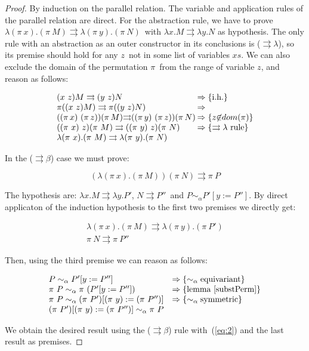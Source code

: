 \documentclass[preprint,10pt]{sigplanconf}
\newcommand{\lam}{\ensuremath{\lambda}}
\newcommand{\alpsym}{\ensuremath{\sim_\alpha}}
\newcommand{\p}{\ensuremath{\rightrightarrows}}
\begin{document}
\begin{proof}
By induction on the parallel relation. The variable and application rules of the parallel relation are direct. For the abstraction rule,  we have to prove $\lam (\pi\ x) . (\pi\ M)  \p  \lam (\pi\ y) . (\pi\ N)$\ with $\lambda x . M  \p  \lambda y . N$ as hypothesis.
The only rule with an abstraction as an outer constructor in its conclusions is ($\p\!\!\lam$), so its premise should hold for any $z$\ not in some list of variables $xs$. We can also exclude the domain of the permutation $\pi$\ from the range of variable $z$, and reason as follows: 

\[
\begin{array}{l@{\hspace{0.2em}}l}
  (x\ z) M \p (y\ z) N & \Rightarrow  \{\text{i.h.} \} \\
  \pi ((x\ z) M) \p \pi ((y\ z) N) & \Rightarrow \\
  ((\pi\,x)\ (\pi\,z)) (\pi\,M) {\p} ((\pi\,y)\ (\pi\,z)) (\pi\,N) & \Rightarrow \{z {\not\in} dom(\pi)\}\\
  ((\pi\ x)\ z) (\pi\ M) \p ((\pi\ y)\ z) (\pi\ N) & \Rightarrow \{\p\lam\ \text{rule}\}\\
  \lam (\pi\ x) . (\pi\ M)  \p  \lam (\pi\ y) . (\pi\ N) & \\
\end{array}
\]

\noindent In the ($\p\!\!\beta$) case we must prove:

\[(\lambda (\pi\ x). (\pi\ M)) (\pi\ N)  \p \pi\ P \]

The hypothesis are: $\lambda x. M \p \lambda y. P'$, $N \p  P''$\ and $P \alpsym P' [y := P'']$. By direct applicaton of the induction hypothesis to the first two premises we directly get:

\begin{equation}
  \label{eq:2}
  \begin{split}
  \lambda (\pi\ x). (\pi\ M) \p \lambda (\pi\ y). (\pi\ P') \\
  \pi\ N \p  \pi\ P''
  \end{split}
\end{equation}

Then, using the third premise we can reason as follows:

\[
\begin{array}{ll}
  P \alpsym P' [y := P''] & \Rightarrow   \{\alpsym\text{equivariant}\}\\
  \pi\ P \alpsym \pi\ (P' [y := P'']) & \Rightarrow  \{\text{lemma~\ref{substPerm}}\} \\
  \pi\ P \alpsym (\pi\ P') [ (\pi\ y) := (\pi\ P'')] & \Rightarrow \{\alpsym\text{symmetric} \}\\
  (\pi\ P') [ (\pi\ y) := (\pi\ P'')] \alpsym \pi\ P &
\end{array}
\]


We obtain the desired result using the (\p$\beta$) rule with~(\ref{eq:2}) and the last result as premises.
\end{proof}
\end{document}
